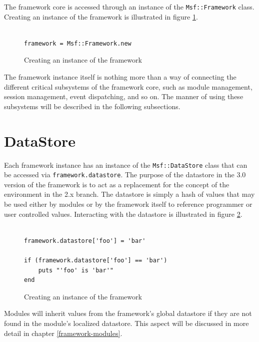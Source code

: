 \documentclass{report}
\begin{document}
\par
The framework core is accessed through an instance of the
\texttt{Msf::Framework} class.  Creating an instance of the
framework is illustrated in figure \ref{fig-code-framework-create}.

\begin{figure}[h]
\begin{verbatim}

framework = Msf::Framework.new
\end{verbatim}
\caption{Creating an instance of the framework}
\label{fig-code-framework-create}
\end{figure}

\par
The framework instance itself is nothing more than a way of
connecting the different critical subsystems of the framework core,
such as module management, session management, event dispatching,
and so on.  The manner of using these subsystems will be described
in the following subsections.

    \section{DataStore}

\par
Each framework instance has an instance of the
\texttt{Msf::DataStore} class that can be accessed via
\texttt{framework.datastore}.  The purpose of the datastore in the
3.0 version of the framework is to act as a replacement for the
concept of the environment in the 2.x branch.  The datastore is
simply a hash of values that may be used either by modules or by the
framework itself to reference programmer or user controlled values.
Interacting with the datastore is illustrated in figure
\ref{fig-code-framework-datastore}.

\begin{figure}[h]
\begin{verbatim}

framework.datastore['foo'] = 'bar'

if (framework.datastore['foo'] == 'bar')
    puts "'foo' is 'bar'"
end
\end{verbatim}
\caption{Creating an instance of the framework}
\label{fig-code-framework-datastore}
\end{figure}

\par
Modules will inherit values from the framework's global datastore if
they are not found in the module's localized datastore.  This aspect
will be discussed in more detail in chapter \ref{framework-modules}.
\end{document}
